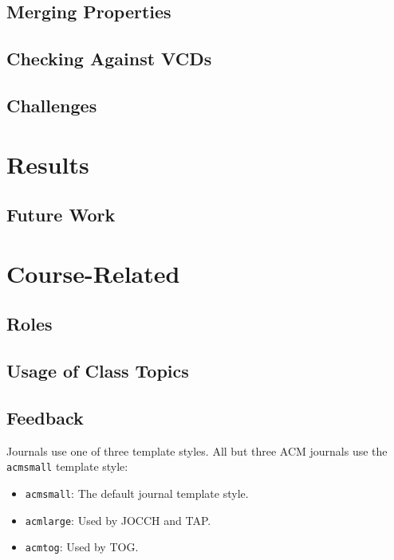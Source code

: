 \documentclass[acmlarge,11pt]{acmart}
\begin{document}
\subsection{Merging Properties}

\subsection{Checking Against VCDs}

\subsection{Challenges}

\section{Results}

\subsection{Future Work}
% 

\section{Course-Related}

\subsection{Roles}

\subsection{Usage of Class Topics}

\subsection{Feedback}


Journals use one of three template styles. All but three ACM journals
use the {\verb|acmsmall|} template style:
\begin{itemize}
\item {\verb|acmsmall|}: The default journal template style.
\item {\verb|acmlarge|}: Used by JOCCH and TAP.
\item {\verb|acmtog|}: Used by TOG.
\end{itemize}
\end{document}

